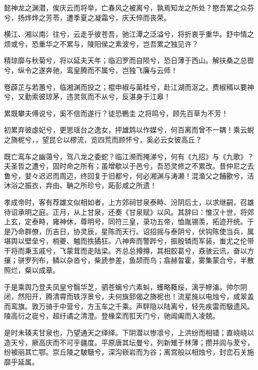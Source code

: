 \documentclass[12pt,UTF8]{ctexbook}
\begin{document}
懿神龙之渊潜，俟庆云而将举，亡春风之被离兮，孰焉知龙之所处？愍吾累之众芬兮，扬烨烨之芳苓，遭季夏之凝霜兮，庆夭悴而丧荣。



横江、湘以南氵往兮，云走乎彼苍吾，驰江潭之泛溢兮，将折衷乎重华。舒中情之烦或兮，恐重华之不累与，陵阳侯之素波兮，岂吾累之独见许？



精琼靡与秋菊兮，将以延夫天年；临汩罗而自陨兮，恐日薄于西山。解扶桑之总辔兮，纵令之遂奔驰，鸾皇腾而不属兮，岂独飞廉与云师！



卷薜芷与若蕙兮，临湘渊而投之；棍申椒与菌桂兮，赴江湖而沤之。费椒稰以要神兮，又勤索彼琼茅，违灵氛而不从兮，反湛身于江皋！



累既攀夫傅说兮，奚不信而遂行？徒恐鷤圭之将鸣兮，顾先百草为不芳！



初累弃彼虙妃兮，更思瑶台之逸女，抨雄鸩以作媒兮，何百离而曾不一耦！乘云蜺之旖柅兮，，望昆仑以樛流，览四荒而顾怀兮，奚必云女彼高丘？



既亡鸾车之幽蔼兮，驾八龙之委蛇？临江濒而掩涕兮，何有《九招》与《九歌》？夫圣哲之遭兮，固时命之所有；虽增欷以于邑兮，吾恐灵修之不累改。昔仲尼之去鲁兮，婓々迟迟而周迈，终回复于旧都兮，何必湘渊与涛濑！混渔父之餔歠兮，洁沐浴之振衣，弃由、聃之所珍兮，跖彭咸之所遗！



孝成帝时，客有荐雄文似相如者，上方郊祠甘泉泰畤、汾阴后土，以求继嗣，召雄待诏承明之庭。正月，从上甘泉，还奏《甘泉赋》以风。其辞曰：惟汉十世，将郊上玄，定泰畤，雍神休，尊明号，同符三皇，录功五帝，恤胤锡羡，拓迹开统。于是乃命群僚，历吉日，协灵辰，星陈而天行。诏招摇与泰阴兮，伏钩陈使当兵，属堪舆以壁垒兮，梢夔、魖而抶獝狂。八神奔而警跸兮，振殷辚而军装，蚩尤之伦带干将而秉玉戚兮，飞蒙茸而走陆梁。齐总总撙撙，其相胶葛兮，猋骇云讯，奋以方攘；骈罗列布，鳞以杂沓兮，柴虒参差，鱼颉而鸟；翕赫曶霍，雾集蒙合兮，半散照烂，粲以成章。



于是乘舆乃登夫凤皇兮翳华芝，驷苍螭兮六素虯，蠖略蕤绥，漓乎幓滀。帅尔阴闭，然阳开，腾清霄而轶浮景兮，夫何旐郅偈之旖柅也！流星旄以电烛兮，咸翠盖而鸾旗。敦万骑于中营兮，方玉车之千乘。声駍隐以陆离兮，轻先疾雷而馺遗风。陵高衍之嵸兮，超纡谲之清澄。登椽栾而羾天门兮，驰阊阖而入凌兢。



是时未辏夫甘泉也，乃望通天之绎绎。下阴潜以惨凛兮，上洪纷而相错；直峣峣以造天兮，厥高庆而不可乎疆度。平原唐其坛曼兮，列新雉于林薄；攒并闾与茇兮，纷被丽其亡鄂。崇丘陵之駊騀兮，深沟嵚岩而为谷；离宫般以相烛兮，封峦石关施靡乎延属。
\end{document}

